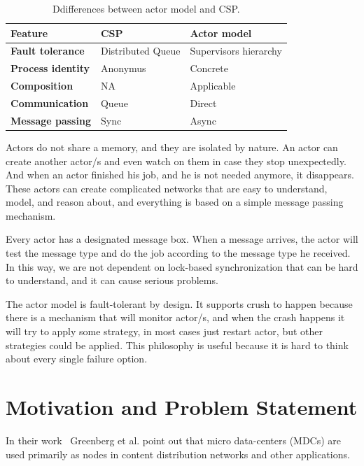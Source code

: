 \begin{table}[h!]
	\begin{center}
		\begin{tabular}{l|l|l}
			\textbf{Feature} & \textbf{CSP} & \textbf{Actor model}\\
			\hline
			\textbf{Fault tolerance} & Distributed Queue &  Supervisors hierarchy \\
			\textbf{Process identity} & Anonymus & Concrete \\
			\textbf{Composition} & NA & Applicable \\
			\textbf{Communication} & Queue & Direct \\
			\textbf{Message passing} & Sync & Async\\
		\end{tabular}
	\end{center}
	\vspace{-0.5cm}
	\caption{Ddifferences between actor model and CSP.}
	\label{tab:table6}
\end{table}

Actors do not share a memory, and they are isolated by nature. An actor can create another actor/s and even watch on them in case they stop unexpectedly. And when an actor finished his job, and he is not needed anymore, it disappears. These actors can create complicated networks that are easy to understand, model, and reason about, and everything is based on a simple message passing mechanism. 

Every actor has a designated message box. When a message arrives, the actor will test the message type and do the job according to the message type he received. In this way, we are not dependent on lock-based synchronization that can be hard to understand, and it can cause serious problems.

The actor model is fault-tolerant by design. It supports crush to happen because there is a  mechanism that will monitor actor/s, and when the crash happens it will try to apply some strategy, in most cases just restart actor, but other strategies could be applied. This philosophy is useful because it is hard to think about every single failure option.
%
%
\section{Motivation and Problem Statement}\label{sec:problem_statement}
%
In their work~\cite{GreenbergHMP09} Greenberg et al. point out that micro data-centers (MDCs) are used primarily as nodes in content distribution networks and other  applications.


